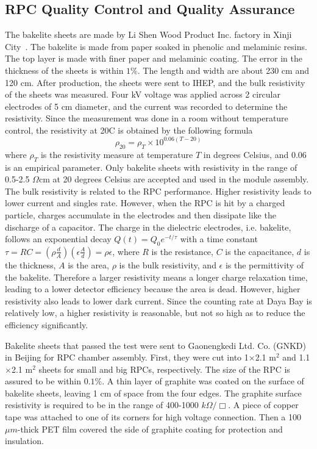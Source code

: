 \subsection{RPC Quality Control and Quality Assurance}
The bakelite sheets are made by Li Shen Wood Product Inc. factory in Xinji City~\cite{Ma2011}. The bakelite is made from paper soaked in phenolic and melaminic resins. The top layer is made with finer paper and melaminic coating. The error in the thickness of the sheets is within $1\%$. The length and width are about 230 cm and 120 cm. After production, the sheets were sent to IHEP, and the bulk resistivity of the sheets was measured. Four kV voltage was applied across 2 circular electrodes of 5 cm diameter, and the current was recorded to determine the resistivity. Since the measurement was done in a room without temperature control, the resistivity at 20\degree C is obtained by the following formula
\begin{equation}
	\rho_{20}=\rho_T\times 10^{0.06(T-20)}
\end{equation}
where $\rho_T$ is the resistivity measure at temperature $T$ in degrees Celsius, and 0.06 is an empirical parameter. Only bakelite sheets with resistivity in the range of 0.5-2.5 $\Omega$cm at 20 degrees Celsius are accepted and used in the module assembly. The bulk resistivity is related to the RPC performance. Higher resistivity leads to lower current and singles rate. However, when the RPC is hit by a charged particle, charges accumulate in the electrodes and then dissipate like the discharge of a capacitor. The charge in the dielectric electrodes, i.e. bakelite, follows an exponential decay $Q(t)=Q_0e^{-t/\tau}$ with a time constant $\tau=RC=\left(\rho\frac{d}{A}\right)\left(\epsilon\frac{A}{d}\right)=\rho\epsilon$, where $R$ is the resistance, $C$ is the capacitance, $d$ is the thickness, $A$ is the area, $\rho$ is the bulk resistivity, and $\epsilon$ is the permittivity of the bakelite. Therefore a larger resistivity means a longer charge relaxation time, leading to a lower detector efficiency because the area is dead. However, higher resistivity also leads to lower dark current. Since the counting rate at Daya Bay is relatively low, a higher resistivity is reasonable, but not so high as to reduce the efficiency significantly.

Bakelite sheets that passed the test were sent to Gaonengkedi Ltd. Co. (GNKD)~\cite{Ma2011} in Beijing for RPC chamber assembly. First, they were cut into 1$\times$2.1 m$^2$ and 1.1$\times$2.1 m$^2$ sheets for small and big RPCs, respectively. The size of the RPC is assured to be within $0.1\%$. A thin layer of graphite was coated on the surface of bakelite sheets, leaving 1 cm of space from the four edges. The graphite surface resistivity is required to be in the range of 400-1000 $k\Omega/\Box$. A piece of copper tape was attached to one of its corners for high voltage connection. Then a 100 $\mu m$-thick PET film covered the side of graphite coating for protection and insulation.

